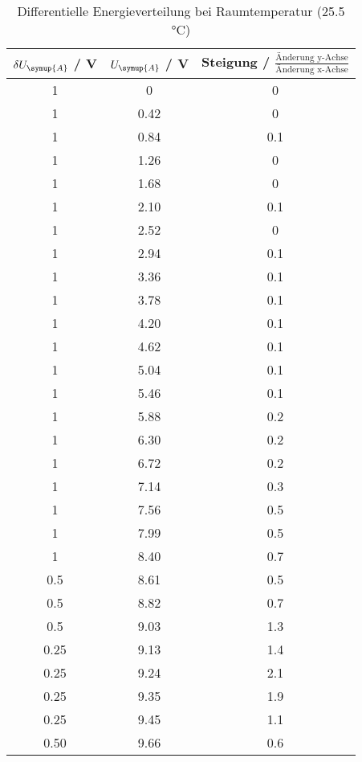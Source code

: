 \begin{table}[!htp]
\centering
\caption{Differentielle Energieverteilung bei Raumtemperatur (25.5 °C)}
\label{tab:messreihe1}
\begin{tabular} {c c c}
\toprule
{{$\delta U_{\symup{A}}$ / V}} & {{$U_{\symup{A}}$ / V}} & {{Steigung  / $\frac{\text{Änderung y-Achse}}{\text{Änderung x-Achse}}$}}  \\
\midrule
1    & 0    & 0   \\
1    & 0.42 & 0   \\
1    & 0.84 & 0.1 \\
1    & 1.26 & 0   \\
1    & 1.68 & 0   \\
1    & 2.10 & 0.1 \\
1    & 2.52 & 0   \\
1    & 2.94 & 0.1 \\
1    & 3.36 & 0.1 \\
1    & 3.78 & 0.1 \\
1    & 4.20 & 0.1 \\
1    & 4.62 & 0.1 \\
1    & 5.04 & 0.1 \\
1    & 5.46 & 0.1 \\
1    & 5.88 & 0.2 \\
1    & 6.30 & 0.2 \\
1    & 6.72 & 0.2 \\
1    & 7.14 & 0.3 \\
1    & 7.56 & 0.5 \\
1    & 7.99 & 0.5 \\
1    & 8.40 & 0.7 \\
0.5  & 8.61 & 0.5 \\
0.5  & 8.82 & 0.7 \\
0.5  & 9.03 & 1.3 \\
0.25 & 9.13 & 1.4 \\
0.25 & 9.24 & 2.1 \\
0.25 & 9.35 & 1.9 \\
0.25 & 9.45 & 1.1 \\
0.50 & 9.66 & 0.6 \\
\bottomrule 
\end{tabular}
\end{table}